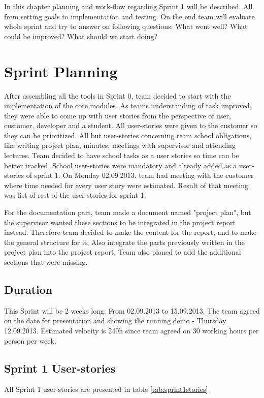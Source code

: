 In this chapter planning and work-flow regarding Sprint 1 will be described. 
All from setting  goals to implementation and testing. On the end team will evaluate whole sprint and try to answer on following questions: What went well? What could be improved? What should we start doing?  


\section{Sprint Planning}
After assembling all the tools in Sprint 0, team decided to start with the implementation of the core modules.
As teams understanding of task improved, they were able to come up with user stories from the perspective of user, customer, developer and a student.
All user-stories were given to the customer so they can be prioritized. 
All but user-stories concerning team school obligations, like writing project plan, minutes, meetings with supervisor and attending lectures.
Team decided to have school tasks as a user stories so time can be better tracked.
School user-stories were mandatory and already added as a user-stories of sprint 1.
On Monday 02.09.2013. team had meeting with the customer where time needed for every user story were estimated.
Result of that meeting was list of rest of the user-stories for sprint 1.

For the documentation part, team made a document named "project plan", but the supervisor wanted these sections to be integrated in the project report instead. Therefore team decided to make the content for the report, and to make the general structure for it. Also integrate the parts previously written in the project plan into the project report. Team also planed to add the additional sections that were missing.

\subsection{Duration}
This Sprint will be 2 weeks long. From 02.09.2013 to 15.09.2013.
The team agreed on the date for presentation and showing the running demo - Thursday 12.09.2013.
Estimated velocity is 240h since team agreed on 30 working hours per person per week.

\subsection{Sprint 1 User-stories}

All Sprint 1 user-stories are presented in table \ref{tab:sprint1stories}

